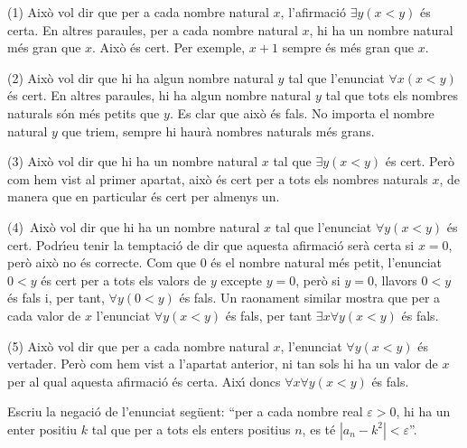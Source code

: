 \begin{solucio}
(1) Aix\`{o} vol dir que per a cada nombre natural $x$, l'afirmaci\'{o}
$\exists y(x<y)$ \'{e}s certa. En altres paraules, per a cada nombre natural
$x$, hi ha un nombre natural m\'{e}s gran que $x$. Aix\`{o} \'{e}s cert. Per
exemple, $x+1$ sempre \'{e}s m\'{e}s gran que $x$.

(2) Aix\`{o} vol dir que hi ha algun nombre natural $y$ tal que l'enunciat
$\forall x(x<y)$ \'{e}s cert. En altres paraules, hi ha algun nombre natural
$y$ tal que tots els nombres naturals s\'{o}n m\'{e}s petits que $y$. Es clar
que aix\`{o} \'{e}s fals. No importa el nombre natural $y$ que triem, sempre
hi haur\`{a} nombres naturals m\'{e}s grans.

(3) Aix\`{o} vol dir que hi ha un nombre natural $x$ tal que $\exists y(x<y)$
\'{e}s cert. Per\`{o} com hem vist al primer apartat, aix\`{o} \'{e}s cert per
a tots els nombres naturals $x$, de manera que en particular \'{e}s cert per
almenys un.

(4)\ Aix\`{o} vol dir que hi ha un nombre natural $x$ tal que l'enunciat
$\forall y(x<y)$ \'{e}s cert. Podr\'{\i}eu tenir la temptaci\'{o} de dir que
aquesta afirmaci\'{o} ser\`{a} certa si $x=0$, per\`{o} aix\`{o} no \'{e}s
correcte. Com que $0$ \'{e}s el nombre natural m\'{e}s petit, l'enunciat $0<y
$ \'{e}s cert per a tots els valors de $y$ excepte $y=0$, per\`{o} si $y=0$,
llavors $0<y$ \'{e}s fals i, per tant, $\forall y(0<y)$ \'{e}s fals. Un
raonament similar mostra que per a cada valor de $x$ l'enunciat $\forall
y(x<y)$ \'{e}s fals, per tant $\exists x\forall y(x<y)$ \'{e}s fals.

(5) Aix\`{o} vol dir que per a cada nombre natural $x$, l'enunciat $\forall
y(x<y)$ \'{e}s vertader. Per\`{o} com hem vist a l'apartat anterior, ni tan
sols hi ha un valor de $x$ per al qual aquesta afirmaci\'{o} \'{e}s certa.
Aix\'{\i} doncs $\forall x\forall y(x<y)$ \'{e}s fals.
\end{solucio}

\begin{exercici}
Escriu la negaci\'{o} de l'enunciat seg\"{u}ent: \textquotedblleft per a cada
nombre real $\varepsilon>0$, hi ha un enter positiu $k$ tal que per a tots els
enters positius $n$, es t\'{e} $\left\vert a_{n}-k^{2}\right\vert
<\varepsilon$\textquotedblright.
\end{exercici}

